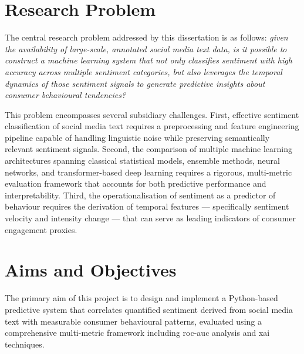 \section{Research Problem}

The central research problem addressed by this dissertation is as follows: \emph{given the availability of large-scale, annotated social media text data, is it possible to construct a machine learning system that not only classifies sentiment with high accuracy across multiple sentiment categories, but also leverages the temporal dynamics of those sentiment signals to generate predictive insights about consumer behavioural tendencies?}

This problem encompasses several subsidiary challenges. First, effective sentiment classification of social media text requires a preprocessing and feature engineering pipeline capable of handling linguistic noise while preserving semantically relevant sentiment signals. Second, the comparison of multiple machine learning architectures spanning classical statistical models, ensemble methods, neural networks, and transformer-based deep learning requires a rigorous, multi-metric evaluation framework that accounts for both predictive performance and interpretability. Third, the operationalisation of sentiment as a predictor of behaviour requires the derivation of temporal features --- specifically sentiment velocity and intensity change --- that can serve as leading indicators of consumer engagement proxies.

\section{Aims and Objectives}

The primary aim of this project is to design and implement a Python-based predictive system that correlates quantified sentiment derived from social media text with measurable consumer behavioural patterns, evaluated using a comprehensive multi-metric framework including \gls{roc}-\gls{auc} analysis and \gls{xai} techniques.

